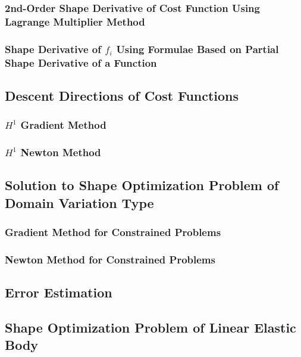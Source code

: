 \documentclass[oneside]{book}
\numberwithin{equation}{section}
\begin{document}
\subsubsection{2nd-Order Shape Derivative of Cost Function Using Lagrange Multiplier Method}

\subsubsection{Shape Derivative of $f_i$ Using Formulae Based on Partial Shape Derivative of a Function}

\subsection{Descent Directions of Cost Functions}

\subsubsection{$H^1$ Gradient Method}

\subsubsection{$H^1$ Newton Method}

\subsection{Solution to Shape Optimization Problem of Domain Variation Type}

\subsubsection{Gradient Method for Constrained Problems}

\subsubsection{Newton Method for Constrained Problems}

\subsection{Error Estimation}

\subsection{Shape Optimization Problem of Linear Elastic Body}
\end{document}
